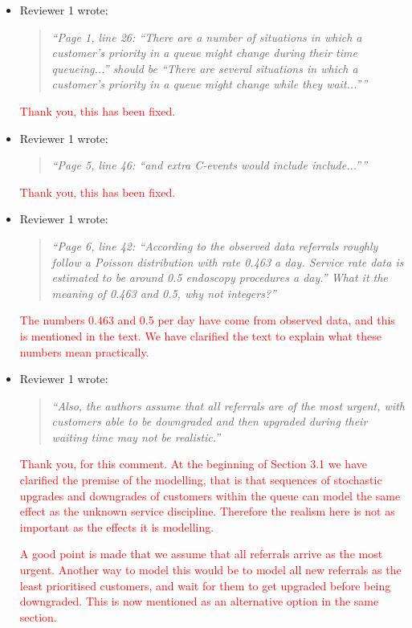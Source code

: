 \documentclass{article}
\begin{document}
\begin{itemize}
\item Reviewer 1 wrote:
\begin{quote}\it
``Page 1, line 26: ``There are a number of situations in which a customer's priority in a queue might change during their time queueing...'' should be ``There are several situations in which a customer's priority in a queue might change while they wait...''''
\end{quote}

\textcolor{red}{Thank you, this has been fixed.}

\item Reviewer 1 wrote:
\begin{quote}\it
``Page 5, line 46: ``and extra C-events would include include...''''
\end{quote}

\textcolor{red}{Thank you, this has been fixed.}

\item Reviewer 1 wrote:
\begin{quote}\it
``Page 6, line 42: ``According to the observed data referrals roughly follow a Poisson distribution with rate 0.463 a day. Service rate data is estimated to be around 0.5 endoscopy procedures a day.'' What it the meaning of 0.463 and 0.5, why not integers?''
\end{quote}

\textcolor{red}{The numbers 0.463 and 0.5 per day have come from observed data, and this is mentioned in the text. We have clarified the text to explain what these numbers mean practically.}

\item Reviewer 1 wrote:
\begin{quote}\it
``Also, the authors assume that all referrals are of the most urgent, with customers able to be downgraded and then upgraded during their waiting time may not be realistic.''
\end{quote}

\textcolor{red}{Thank you, for this comment. At the beginning of Section 3.1 we have clarified the premise of the modelling, that is that sequences of stochastic upgrades and downgrades of customers within the queue can model the same effect as the unknown service discipline. Therefore the realism here is not as important as the effects it is modelling.}


\textcolor{red}{A good point is made that we assume that all referrals arrive as the most urgent. Another way to model this would be to model all new referrals as the least prioritised customers, and wait for them to get upgraded before being downgraded. This is now mentioned as an alternative option in the same section.}



\end{itemize}
\end{document}
